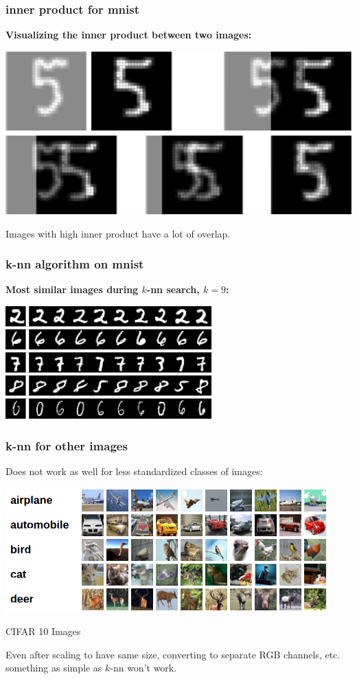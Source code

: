 \documentclass[handout,compress]{beamer}
\begin{document}
\begin{frame}
	\frametitle{inner product for mnist}
	\textbf{Visualizing the inner product between two images:}
		\begin{center}
			\includegraphics[width=.8\textwidth]{innerproduct_visualizatoin.png}
		\end{center}
	Images with high inner product have a lot of overlap.
\end{frame}

\begin{frame}
	\frametitle{k-nn algorithm on mnist}
	\textbf{Most similar images during $k$-nn search, $k=9$:}
	\begin{center}
		\includegraphics[width=.5\textwidth]{MNISTknn.png}
	\end{center}
\end{frame}

\begin{frame}
	\frametitle{k-nn for other images}
	Does not work as well for less standardized classes of images:
	\begin{center}
		\includegraphics[width=.8\textwidth]{cifar10.png}
		
		CIFAR 10 Images
	\end{center}
	Even after scaling to have same size, converting to separate RGB channels, etc. something as simple as $k$-nn won't work.
\end{frame}
\end{document}
